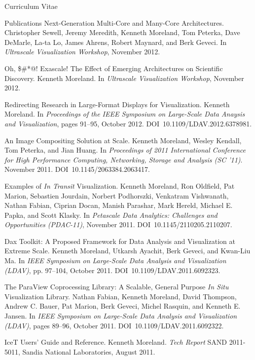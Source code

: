 \documentclass{article}
\begin{document}
\begin{cv}{Curriculum Vitae}
\begin{cvlist}{Publications}
      Next-Generation Multi-Core and Many-Core Architectures. Christopher
      Sewell, Jeremy Meredith, Kenneth Moreland, Tom Peterka, Dave DeMarle,
      La-ta Lo, James Ahrens, Robert Maynard, and Berk Geveci. In
      \emph{Ultrascale Visualization Workshop}, November 2012.
    \item[Oh, \$\#*@!  Exascale!  The Effect of Emerging Architectures on
      Scientific] Discovery.  Kenneth Moreland.  In \emph{Ultrascale
      Visualization Workshop}, November 2012.
    \item[Redirecting Research in Large-Format Displays for Visualization.]
      Kenneth Moreland. In \emph{Proceedings of the IEEE Symposium on
        Large-Scale Data Anaysis and Visualization}, pages 91--95, October
      2012. DOI~10.1109/LDAV.2012.6378981.
    \item[An Image Compositing Solution at Scale.] Kenneth Moreland, Wesley
      Kendall, Tom Peterka, and Jian Huang. In \emph{Proceedings of 2011
        International Conference for High Performance Computing,
        Networking, Storage and Analysis (SC '11)}. November
      2011. DOI~10.1145/2063384.2063417.
    \item[Examples of \emph{In Transit} Visualization.] Kenneth Moreland,
      Ron Oldfield, Pat Marion, Sebastien Jourdain, Norbert Podhorszki,
      Venkatram Vishwanath, Nathan Fabian, Ciprian Docan, Manish Parashar,
      Mark Hereld, Michael E. Papka, and Scott Klasky. In \emph{Petascale
        Data Analytics: Challenges and Opportunities (PDAC-11)}, November
      2011. DOI~10.1145/2110205.2110207.
    \item[Dax Toolkit: A Proposed Framework for Data Analysis and
      Visualization at] Extreme Scale. Kenneth Moreland, Utkarsh Ayachit,
      Berk Geveci, and Kwan-Liu Ma. In \emph{IEEE Symposium on Large-Scale
        Data Analysis and Visualization (LDAV)}, pp. 97--104, October
      2011. DOI~10.1109/LDAV.2011.6092323.
    \item[The ParaView Coprocessing Library: A Scalable, General Purpose
      \emph{In Situ}] Visualization Library. Nathan Fabian, Kenneth
      Moreland, David Thompson, Andrew C. Bauer, Pat Marion, Berk Geveci,
      Michel Rasquin, and Kenneth E. Jansen. In \emph{IEEE Symposium on
        Large-Scale Data Analysis and Visualization (LDAV)}, pages 89--96,
      October 2011. DOI~10.1109/LDAV.2011.6092322.
    \item[IceT Users' Guide and Reference.] Kenneth Moreland. \emph{Tech
      Report} SAND 2011-5011, Sandia National Laboratories, August 2011.

\end{cvlist}
\end{cv}
\end{document}
